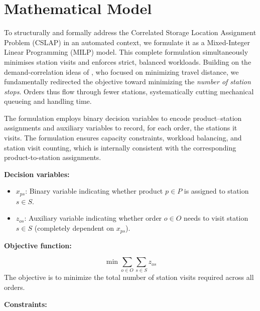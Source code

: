 \documentclass[preprint,review,11pt,authoryear]{elsarticle}
\begin{document}
\section{Mathematical Model}\label{sec:LP_Approach}

To structurally and formally address the Correlated Storage Location Assignment Problem (CSLAP) in an automated context, we formulate it as a Mixed-Integer Linear Programming (MILP) model. This complete formulation simultaneously minimises station visits and enforces strict, balanced workloads. Building on the demand-correlation ideas of \citet{wang2020}, who focused on minimizing travel distance, we fundamentally redirected the objective toward minimizing the \emph{number of station stops}. Orders thus flow through fewer stations, systematically cutting mechanical queueing and handling time.

The formulation employs binary decision variables to encode product–station assignments and auxiliary variables to record, for each order, the stations it visits. The formulation ensures capacity constraints, workload balancing, and station visit counting, which is internally consistent with the corresponding product-to-station assignments.



\noindent \textbf{Decision variables:}
\begin{itemize}
    \item $x_{ps}$: Binary variable indicating whether product $p \in P$ is assigned to station $s \in S$.
    \item $z_{os}$: Auxiliary variable indicating whether order $o \in O$ needs to visit station $s \in S$ (completely dependent on $x_{ps}$). 

\end{itemize}

\noindent \textbf{Objective function:}

\begin{equation}
\min \sum_{o \in O} \sum_{s \in S} z_{os}
\label{obj}
\end{equation}
The objective is to minimize the total number of station visits required across all orders.

\noindent \textbf{Constraints:}
\end{document}
